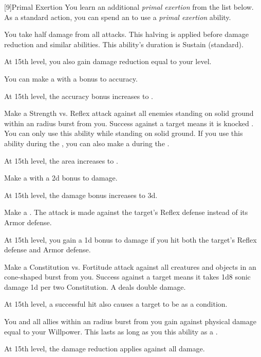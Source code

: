         [9]{Primal Exertion}
        You learn an additional \textit{primal exertion} from the list below.
        As a standard action, you can spend an  to use a \textit{primal exertion} ability.
        {
             You take half damage from all attacks.
            This halving is applied before damage reduction and similar abilities.
            This ability's duration is Sustain (standard).

            At 15th level, you also gain damage reduction equal to your level.

             You can make a  with a  bonus to accuracy.

            At 15th level, the accuracy bonus increases to .

             Make a Strength vs. Reflex attack against all enemies standing on solid ground within an \areamed radius burst from you.
            Success against a target means it is knocked \prone.
            You can only use this ability while standing on solid ground.
            If you use this ability during the , you can also make a  during the .

            At 15th level, the area increases to \arealarge.

             Make a  with a \plus2d bonus to damage.

            At 15th level, the damage bonus increases to \plus3d.

             Make a .
            The attack is made against the target's Reflex defense instead of its Armor defense.

            At 15th level, you gain a \plus1d bonus to damage if you hit both the target's Reflex defense and Armor defense.

             Make a Constitution vs. Fortitude attack against all creatures and objects in an \arealarge cone-shaped burst from you.
            Success against a target means it takes 1d8 sonic damage \plus1d per two Constitution.
            A  deals double damage.

            At 15th level, a successful hit also causes a target to be \deafened as a condition.

             You and all allies within an \arealarge radius burst from you gain  against physical damage equal to your Willpower.
            This lasts as long as you  this ability as a .

            At 15th level, the damage reduction applies against all damage.
        }

